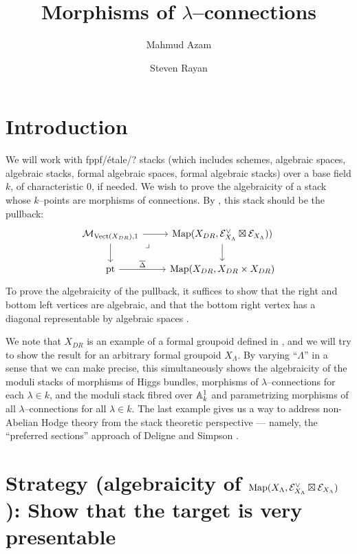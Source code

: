 \documentclass[11pt]{amsart}
\title[Morphisms of {$\lambda$}--connections]
      {Morphisms of {$\lambda$}--connections}
\author{Mahmud Azam}
\author{Steven Rayan}
\begin{document}
\begin{abstract}
\end{abstract}

\maketitle

\tableofcontents

\section{Introduction}

We will work with fppf/\'etale/? stacks
(which includes schemes, algebraic spaces, algebraic stacks,
formal algebraic spaces, formal algebraic stacks)
over a base field $k$, of characteristic $0$, if needed.
We wish to prove the algebraicity of a stack whose $k$--points are morphisms of
connections. By \cites{NonAbHodgeFilt, GeomNonAbHodgeFilt, ModQuivBun},
this stack should be the pullback:
\[\begin{tikzcd}
\mc{M}_{\Vect(X_{DR}), 1}
  \ar[r] \ar[d] \ar[rd, "\lrcorner" very near start, phantom] &
\Map(X_{DR}, \mc{E}_{X_\Lambda}^\vee \boxtimes \mc{E}_{X_\Lambda})) \ar[d] \\
\mathrm{pt} \ar[r, "\overline{\Delta}"] &
\Map(X_{DR}, X_{DR} \times X_{DR})
\end{tikzcd}\]
To prove the algebraicity of the pullback, it suffices to show that the
right and bottom left vertices are algebraic, and that the bottom right
vertex has a diagonal representable by algebraic spaces
\cite[\href{https://stacks.math.columbia.edu/tag/04TF}{Lemma 04TF}]{stacks-project}.

We note that $X_{DR}$ is an example of a formal groupoid defined in
\cite[23]{AlgGeom-n-St}, and we will try to show the result for
an arbitrary formal groupoid $X_\Lambda$. By varying ``$\Lambda$'' in a sense
that we can make precise, this simultaneously
shows the algebraicity of the moduli stacks of morphisms of Higgs bundles,
morphisms of $\lambda$--connections for each $\lambda \in k$, and the moduli stack
fibred over $\mathbb{A}^1_k$ and parametrizing morphisms of all $\lambda$--connections
for all $\lambda \in k$. The last example gives us a way to address non-Abelian
Hodge theory from the stack theoretic perspective ---
namely, the ``preferred sections'' approach of Deligne and Simpson
\cites{NonAbHodgeFilt,GeomNonAbHodgeFilt}.

\section{Strategy (algebraicity of
{$\mathrm{Map}(X_\Lambda, \mathcal{E}_{X_\Lambda}^\vee \boxtimes \mathcal{E}_{X_\Lambda})$}): Show that
the target is very presentable \cite[69]{Prsntbl-n-St}}
\end{document}
